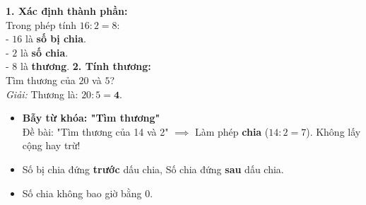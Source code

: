 \documentclass[11pt,a4paper]{article}
\begin{document}
\vspace{-1.5mm}
\noindent
\begin{minipage}[t]{0.49\textwidth}\vspace{0pt}
\begin{tcolorbox}[
  enhanced,
  colback=green!4!white,
  colframe=green!60!black,
  arc=2mm, boxrule=0.8pt,
  left=2mm, right=2mm, top=1.8mm, bottom=1.8mm,
  title={\footnotesize\bfseries\color{white}\faCheckCircle\ 4. Ví dụ thực hành chuẩn mực}
]
{\footnotesize
\textbf{1. Xác định thành phần:}\\
Trong phép tính $16 : 2 = 8$:\\
- $16$ là \textbf{số bị chia}.\\
- $2$ là \textbf{số chia}.\\
- $8$ là \textbf{thương}.
\textbf{2. Tính thương:}\\
Tìm thương của $20$ và $5$?\\
\textit{Giải:} Thương là: $20 : 5 = \mathbf{4}$.
}
\end{tcolorbox}
\end{minipage}
\hfill
\begin{minipage}[t]{0.49\textwidth}\vspace{0pt}
\begin{tcolorbox}[
  enhanced,
  colback=red!4!white,
  colframe=red!75!black,
  arc=2mm, boxrule=0.8pt,
  left=2mm, right=2mm, top=1.8mm, bottom=1.8mm,
  title={\footnotesize\bfseries\color{white}\faExclamationTriangle\ 5. Mẹo tránh bẫy trắc nghiệm}
]
{\footnotesize
\begin{itemize}\setlength{\itemsep}{1pt}\setlength{\leftskip}{-2.5mm}
  \item \textbf{Bẫy từ khóa: "Tìm thương"}\\
  Đề bài: "Tìm thương của 14 và 2" $\implies$ Làm phép \textbf{chia} ($14 : 2 = 7$). Không lấy cộng hay trừ!
  \item Số bị chia đứng \textbf{trước} dấu chia, Số chia đứng \textbf{sau} dấu chia.
  \item Số chia không bao giờ bằng $0$.
\end{itemize}
}
\end{tcolorbox}
\end{minipage}
\end{document}
